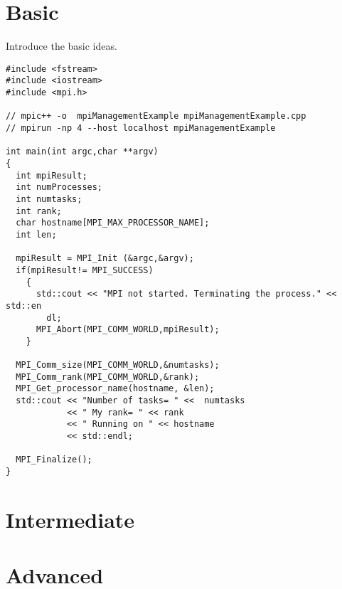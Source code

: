 
\section{Basic}

Introduce the basic ideas.

\lstset{language=C++, numbers=left, numberstyle=\tiny, stepnumber=1,
  numbersep=5pt, commentstyle=\scriptsize}
\begin{lstlisting}[caption={Basic Process Information},
                   basicstyle=\scriptsize,
                   label=listing:touch]
#include <fstream>
#include <iostream>
#include <mpi.h>

// mpic++ -o  mpiManagementExample mpiManagementExample.cpp 
// mpirun -np 4 --host localhost mpiManagementExample

int main(int argc,char **argv)
{
  int mpiResult;
  int numProcesses;
  int numtasks;
  int rank;
  char hostname[MPI_MAX_PROCESSOR_NAME];
  int len;

  mpiResult = MPI_Init (&argc,&argv);
  if(mpiResult!= MPI_SUCCESS)
    {
      std::cout << "MPI not started. Terminating the process." << std::en
        dl;
      MPI_Abort(MPI_COMM_WORLD,mpiResult);
    }

  MPI_Comm_size(MPI_COMM_WORLD,&numtasks);
  MPI_Comm_rank(MPI_COMM_WORLD,&rank);
  MPI_Get_processor_name(hostname, &len);
  std::cout << "Number of tasks= " <<  numtasks
            << " My rank= " << rank
            << " Running on " << hostname
            << std::endl;

  MPI_Finalize();
}
\end{lstlisting}


\section{Intermediate}

\section{Advanced}


